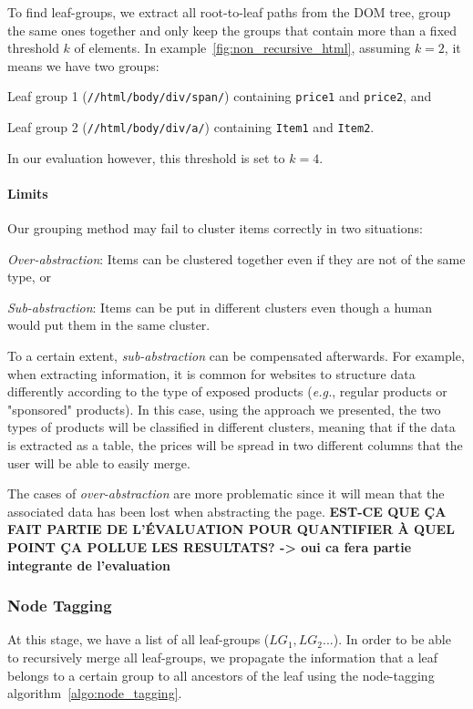 To find leaf-groups, we extract all root-to-leaf paths from the DOM tree, group the same ones together
and only keep the groups that contain more than a fixed threshold $k$ of elements.
In example~\ref{fig:non_recursive_html}, assuming $k=2$, it means we have two groups:
\begin{compactenum}
  \item Leaf group 1 (\texttt{//html/body/div/span/}) containing \texttt{price1} and \texttt{price2}, and
  \item Leaf group 2 (\texttt{//html/body/div/a/}) containing \texttt{Item1} and \texttt{Item2}.
\end{compactenum}
In our evaluation however, this threshold is set to $k=4$.

\paragraph{Limits}
Our grouping method may fail to cluster items correctly in two situations:
\begin{compactitem}
  \item \emph{Over-abstraction}: Items can be clustered together even if they are not of the same type, or
  \item \emph{Sub-abstraction}: Items can be put in different clusters even though a human would put them in the same cluster.
\end{compactitem}
To a certain extent, \emph{sub-abstraction} can be compensated afterwards.
For example, when extracting information, it is common for websites to structure data differently according to the type of exposed products (\emph{e.g.}, regular products or "sponsored" products). 
In this case, using the approach we presented, the two types of products will be classified in different clusters, meaning that if the data is extracted as a table, the prices will be spread in two different columns that the user will be able to easily merge.

The cases of \emph{over-abstraction} are more problematic since it will mean that the associated data has been lost when abstracting the page.
\textbf{EST-CE QUE ÇA FAIT PARTIE DE L'ÉVALUATION POUR QUANTIFIER À QUEL POINT ÇA POLLUE LES RESULTATS? -> oui ca fera partie integrante de l'evaluation}

\subsubsection{Node Tagging}
\label{appstract:sec:node_tagging}
At this stage, we have a list of all leaf-groups ($LG_1, LG_2...$). 
In order to be able to recursively merge all leaf-groups, we propagate the information that a leaf belongs to a certain group to all ancestors of the leaf using the node-tagging algorithm~\ref{algo:node_tagging}.

